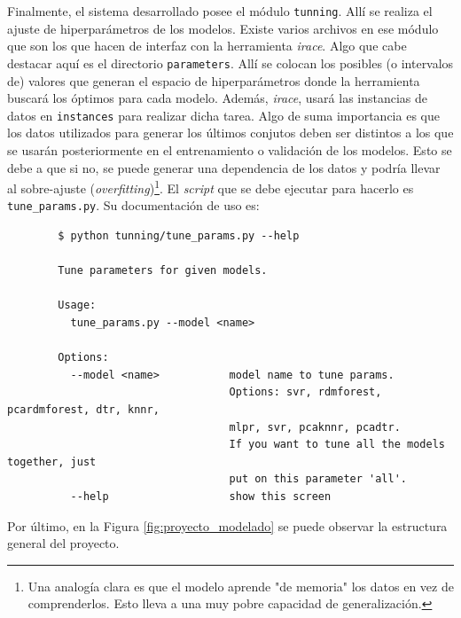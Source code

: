       \par Finalmente, el sistema desarrollado posee el módulo \verb|tunning|.
        Allí se realiza el ajuste de hiperparámetros de los modelos.
        Existe varios archivos en ese módulo que son los que hacen de interfaz
        con la herramienta \textit{irace}. Algo que cabe destacar aquí es el
        directorio \verb|parameters|. Allí se colocan los posibles
        (o intervalos de) valores que generan el espacio de hiperparámetros
        donde la herramienta buscará los óptimos para cada modelo. Además,
        \textit{irace}, usará las instancias de datos en \verb|instances|
        para realizar dicha tarea. Algo de suma importancia es que
        los datos utilizados para generar los últimos conjutos deben ser distintos
        a los que se usarán posteriormente en el entrenamiento o validación de
        los modelos. Esto se debe a que si no, se puede generar una dependencia
        de los datos y podría llevar al sobre-ajuste (\textit{overfitting})\footnote{Una
        analogía clara es que el modelo aprende "de memoria" los datos en vez de
        comprenderlos. Esto lleva a una muy pobre capacidad de generalización.}.
        El \textit{script} que se debe ejecutar para hacerlo es \verb|tune_params.py|.
        Su documentación de uso es:
        \begin{lstlisting}
        $ python tunning/tune_params.py --help

        Tune parameters for given models.

        Usage:
          tune_params.py --model <name>

        Options:
          --model <name>           model name to tune params.
                                   Options: svr, rdmforest, pcardmforest, dtr, knnr,
                                   mlpr, svr, pcaknnr, pcadtr.
                                   If you want to tune all the models together, just
                                   put on this parameter 'all'.
          --help                   show this screen

        \end{lstlisting}
      \par Por último, en la Figura \ref{fig:proyecto_modelado} se puede observar
        la estructura general del proyecto.

